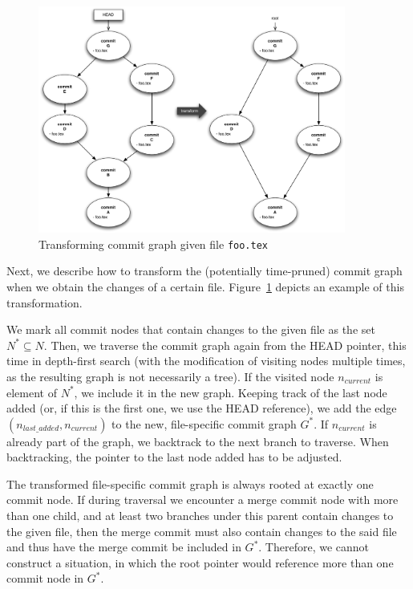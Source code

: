 \begin{figure}
\centering
\includegraphics[width=0.9\textwidth]{./figures/git-commit-history2b}
\caption{Transforming commit graph given file \texttt{foo.tex}} \label{fig:git-commit2b}
\end{figure}

Next, we describe how to transform the (potentially time-pruned) commit graph when we obtain the changes of a certain file.  Figure~\ref{fig:git-commit2b} depicts an example of this transformation.

\begin{defi}
We mark all commit nodes that contain changes to the given file as the set $N^{*} \subseteq N$. Then, we traverse the commit graph again from the HEAD pointer, this time in depth-first search (with the modification of visiting nodes multiple times, as the resulting graph is not necessarily a tree). If the visited node $n_{current}$ is element of $N^{*}$, we include it in the new graph. Keeping track of the last node added (or, if this is the first one, we use the HEAD reference), we add the edge $(n_{last\_added}, n_{current})$ to the new, file-specific commit graph $G^{*}$. If $n_{current}$ is already part of the graph, we backtrack to the next branch to traverse.  When backtracking, the pointer to the last node added has to be adjusted.
\end{defi}

\begin{lem}
The transformed file-specific commit graph is always rooted at exactly one commit node.  If during traversal we encounter a merge commit node with more than one child, and at least two branches under this parent contain changes to the given file, then the merge commit must also contain changes to the said file and thus have the merge commit be included in $G^{*}$.  Therefore, we cannot construct a situation, in which the root pointer would reference more than one commit node in $G^{*}$.
\end{lem}

